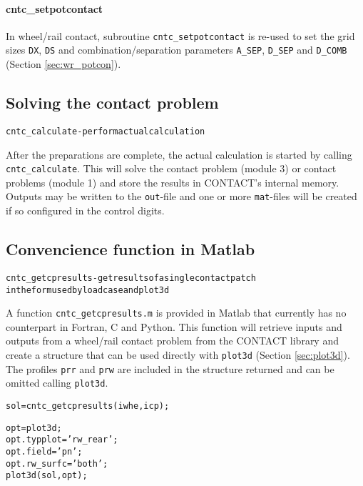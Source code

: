\documentclass[12pt]{report}
\begin{document}
\paragraph{cntc\_setpotcontact}

In wheel/rail contact, subroutine {\tt cntc\_setpotcontact} is re-used to
set the grid sizes {\tt DX}, {\tt DS} and combination/separation parameters
{\tt A\_SEP}, {\tt D\_SEP} and {\tt D\_COMB} (Section \ref{sec:wr_potcon}).

\subsection{Solving the contact problem}

\begin{alltt}\small
cntc_calculate                - perform actual calculation
\end{alltt}

After the preparations are complete, the actual calculation is started by
calling {\tt cntc\_\-cal\-cu\-late}. This will solve the contact problem
(module 3) or contact problems (module 1) and store the results in
CONTACT's internal memory. Outputs may be written to the {\tt out}-file and
one or more {\tt mat}-files will be created if so configured in the control
digits.

\subsection{Convencience function in Matlab}

\begin{alltt}\small
cntc_getcpresults             - get results of a single contact patch
                                in the form used by loadcase and plot3d
\end{alltt}

A function {\tt cntc\_getcpresults.m} is provided in Matlab that currently
has no counterpart in Fortran, C and Python. This function will retrieve
inputs and outputs from a wheel/rail contact problem from the CONTACT
library and create a structure that can be used directly with {\tt plot3d}
(Section \ref{sec:plot3d}). The profiles {\tt prr} and {\tt prw} are
included in the structure returned and can be omitted calling {\tt plot3d}.
\begin{alltt}\small
   sol = cntc_getcpresults(iwhe, icp);

   opt = plot3d;
   opt.typplot  = 'rw_rear';
   opt.field    = 'pn';
   opt.rw_surfc = 'both';
   plot3d(sol, opt);
\end{alltt}
\end{document}

